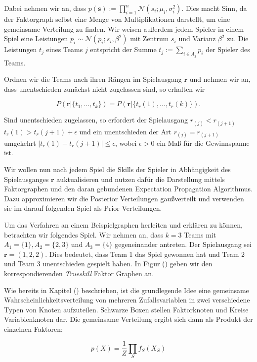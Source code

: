 \documentclass[12pt,a4paper]{scrartcl}
\numberwithin{equation}{section}
\begin{document}
 Dabei nehmen wir an, dass $p(\mathbf{s}) := \prod_{i = 1}^n \mathcal{N}(s_i;\mu_i,\sigma_i^2)$. Dies macht Sinn, da der Faktorgraph selbst eine Menge von Multiplikationen darstellt, um
 eine gemeinsame Verteilung zu finden. 
 Wir weisen außerdem jedem Spieler in einem Spiel eine Leistungen $p_i \sim \mathcal{N}(p_i; s_i,\beta^2)$ mit Zentrum $s_i$ und Varianz $\beta^2$ zu. Die Leistungen $t_j$ eines Teams
 $j$ entspricht der Summe $t_j := \sum_{i \in A_j} p_i$ der Spieler des Teams. 
 
 Ordnen wir die Teams nach ihren Rängen im Spielausgang $\mathbf{r}$ und nehmen wir an, dass unentschieden zunächst nicht zugelassen sind, so erhalten wir
 
 \begin{equation}
  P(\mathbf{r}| \{t_1,...,t_k\}) = P(\mathbf{r}| \{t_r(1),...,t_r(k)\}).
 \end{equation}

 Sind unentschieden zugelassen, so erfordert der Spielausgang $r_(j) < r_(j+1)$ $t_r(1) > t_r(j+1) + \epsilon$ und ein unentschieden der Art $r_(j) = r_(j+1)$ umgekehrt 
 $|t_r(1) - t_r(j+1)| \leq \epsilon$, wobei $\epsilon > 0$ ein Maß für die Gewinnspanne ist.
 
 Wir wollen nun nach jedem Spiel die Skills der Spieler in Abhängigkeit des Spielausganges $\mathbf{r}$ auktualisieren und nutzen dafür die Darstellung mittels Faktorgraphen und
 den daran gebundenen Expectation Propagation Algorithmus. 
 Dazu approximieren wir die Posterior Verteilungen gaußverteilt und verwenden sie im darauf folgenden Spiel als Prior Verteilungen. 
 
 Um das Verfahren an einem Beispielgraphen herleiten und erklären zu können, betrachten wir folgendes Spiel. 
 Wir nehmen an, dass $k = 3$ Teams mit $A_1 = \{1\}, A_2 = \{2,3\} \text{ und } A_3 = \{4\}$ gegeneinander antreten. 
 Der Spielausgang sei $\mathbf{r} = (1,2,2)$. Dies bedeutet, dass Team 1 das Spiel gewonnen hat und Team 2 und Team 3 unentschieden gespielt haben. 
 In Figur () geben wir den korrespondierenden \textit{Trueskill} Faktor Graphen an.
 
 Wie bereits in Kapitel () beschrieben, ist die grundlegende Idee eine gemeinsame Wahrscheinlichkeitsverteilung von mehreren Zufallsvariablen 
 in zwei verschiedene Typen von Knoten aufzuteilen. Schwarze Boxen stellen Faktorknoten und Kreise Variablenknoten dar. 
 Die gemeinsame Verteilung ergibt sich dann als Produkt der einzelnen Faktoren: 
 
 \begin{equation}
  p(X) = \frac{1}{Z} \prod_S f_S(X_S)
 \end{equation}
 
\end{document}
